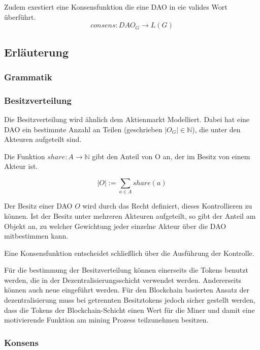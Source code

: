 \documentclass[]{article}
\begin{document}
Zudem exestiert eine Konsensfunktion die eine DAO in eie valides Wort überführt. 
  \[consens: DAO_G \rightarrow L(G)\] 


\subsection{Erläuterung}

\subsubsection*{Grammatik}

\subsubsection*{Besitzverteilung}


Die Besitzverteilung wird ähnlich dem Aktienmarkt Modelliert. Dabei hat eine DAO ein bestimmte Anzahl an Teilen (geschrieben $|O_G| \in \mathbb{N}$), die unter den Akteuren aufgeteilt sind. 

Die Funktion $share: A \rightarrow \mathbb{N}$ gibt den Anteil von O an, der im Besitz von einem Akteur ist. 

\[ |O| := \sum_{a \in A} share(a) \] 

Der Besitz einer DAO $O$ wird durch das Recht definiert, dieses Kontrollieren zu können\cite{Waldron2004}. Ist der Besitz unter mehreren Akteuren aufgeteilt, so gibt der Anteil am Objekt an, zu welcher Gewichtung jeder einzelne Akteur über die DAO mitbestimmen kann.

Eine Konsensfunktion entscheidet schließlich über die Ausführung der Kontrolle.

Für die bestimmung der Besitzverteilung können einerseits die Tokens benutzt werden, die in der Dezentralisierungsschicht verwendet werden. Andererseits können auch neue eingeführt werden. Für den Blockchain basierten Ansatz der dezentralisierung muss bei getrennten Besitztokens jedoch sicher gestellt werden, dass die Tokens der Blockchain-Schicht einen Wert für die Miner und damit eine motivierende Funktion am mining Prozess teilzunehmen besitzen. 

% 




\subsubsection*{Konsens}
\end{document}
